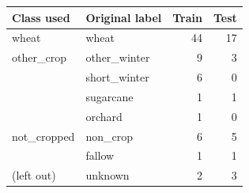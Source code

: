 \begin{tabular}{llrr}
\toprule
Class used & Original label & Train & Test \\
\midrule
wheat & wheat & 44 & 17 \\
\midrule
other\_crop & other\_winter & 9 & 3 \\
 & short\_winter & 6 & 0 \\
 & sugarcane & 1 & 1 \\
 & orchard & 1 & 0 \\
\midrule
not\_cropped & non\_crop & 6 & 5 \\
 & fallow & 1 & 1 \\
\midrule
(left out) & unknown & 2 & 3 \\
\bottomrule
\end{tabular}
